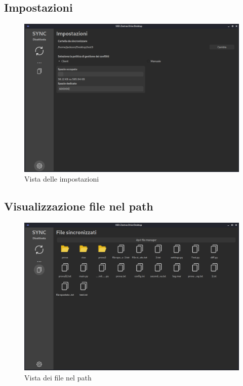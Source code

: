\subsection{Impostazioni}
\begin{figure}[H]
    \centering
    \includegraphics[scale = 0.30]{components/img/settings.png}
    \caption{Vista delle impostazioni}
    \label{fig:Vista delle impostazioni}
\end{figure}


\subsection{Visualizzazione file nel path}

\begin{figure}[H]
    \centering
    \includegraphics[scale = 0.30]{components/img/file-view.png}
    \caption{Vista dei file nel path}
    \label{fig:Vista dei file nel path}
\end{figure}
